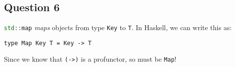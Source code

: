 \subsection{Question 6}

\lstinline[language=C++]{std::map} \textit{maps} objects from type
\lstinline{Key} to \lstinline{T}. In Haskell, we can write this as:

\begin{lstlisting}
type Map Key T = Key -> T
\end{lstlisting}

Since we know that \lstinline{(->)} is a profunctor, so must be \lstinline{Map}!
